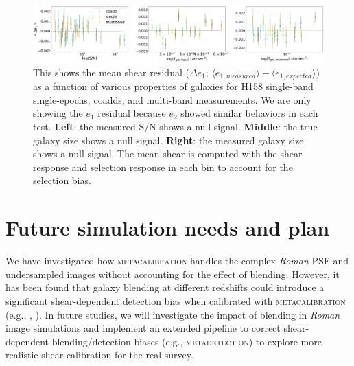 \documentclass[fleqn,usenatbib]{mnras}
\begin{document}
\begin{figure}
    \centering
	\includegraphics[width=\textwidth]{H158_meanshear_measured_properties_perbin_e1_v6.pdf}
    \caption{This shows the mean shear residual ($\Delta e_{1}$; $\langle e_{1,measured} \rangle - \langle e_{1,expected} \rangle$) as a function of various properties of galaxies for H158 single-band single-epochs, coadds, and multi-band measurements. We are only showing the $e_1$ residual because $e_{2}$ showed similar behaviors in each test. \textbf{Left}: the measured S/N shows a null signal. \textbf{Middle}: the true galaxy size shows a null signal. \textbf{Right}: the measured galaxy size shows a null signal. The mean shear is computed with the shear response and selection response in each bin to account for the selection bias.}
    \label{fig:meanshear}
\end{figure}



\section{Future simulation needs and plan}
\label{sec:discussion}

We have investigated how \textsc{metacalibration} handles the complex \emph{Roman} PSF and undersampled images without accounting for the effect of blending. However, it has been found that galaxy blending at different redshifts could introduce a significant shear-dependent detection bias when calibrated with \textsc{metacalibration} (e.g., \citealt{2020ApJ...902..138S}, \citealt{2020arXiv201208567M}). In future studies, we will investigate the impact of blending in \emph{Roman} image simulations and implement an extended pipeline to correct shear-dependent blending/detection biases (e.g.,  \textsc{metadetection}) to explore more realistic shear calibration for the real survey. 
\end{document}

